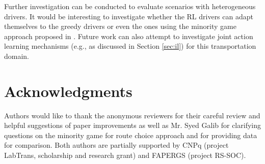 \documentclass{RITA}
\begin{document}
Further investigation can be conducted to evaluate scenarios with heterogeneous drivers. It would be interesting to investigate whether the RL drivers can adapt themselves to the greedy drivers or even the ones using the minority game approach proposed in \cite{Galib&Moser2011}. Future work can also attempt to investigate joint action learning mechanisms (e.g., as discussed in Section \ref{sec:il}) for this transportation domain. %

\section*{Acknowledgments}

Authors would like to thank the anonymous reviewers for their careful review and helpful suggestions of paper improvements as well as Mr. Syed Galib for clarifying questions on the minority game for route choice approach and for providing data for comparison. Both authors are partially supported by CNPq (project LabTrans, scholarship and research grant) and FAPERGS (project RS-SOC). %
\end{document}

